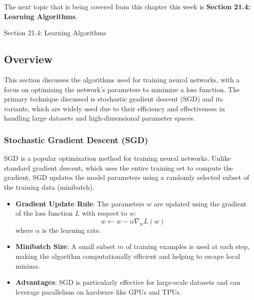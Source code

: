 The next topic that is being covered from this chapter this week is \textbf{Section 21.4: Learning Algorithms}.

\begin{notes}{Section 21.4: Learning Algorithms}
    \subsection*{Overview}

    This section discusses the algorithms used for training neural networks, with a focus on optimizing the network's parameters to minimize a loss function. The primary technique discussed is stochastic 
    gradient descent (SGD) and its variants, which are widely used due to their efficiency and effectiveness in handling large datasets and high-dimensional parameter spaces.
    
    \subsubsection*{Stochastic Gradient Descent (SGD)}
    
    SGD is a popular optimization method for training neural networks. Unlike standard gradient descent, which uses the entire training set to compute the gradient, SGD updates the model parameters using 
    a randomly selected subset of the training data (minibatch).
    
    \begin{highlight}
    
        \begin{itemize}
            \item \textbf{Gradient Update Rule}: The parameters $w$ are updated using the gradient of the loss function $L$ with respect to $w$:
            \[
            w \leftarrow w - \alpha \nabla_w L(w)
            \]
            where $\alpha$ is the learning rate.
            \item \textbf{Minibatch Size}: A small subset $m$ of training examples is used at each step, making the algorithm computationally efficient and helping to escape local minima.
            \item \textbf{Advantages}: SGD is particularly effective for large-scale datasets and can leverage parallelism on hardware like GPUs and TPUs.
        \end{itemize}
    
    \end{highlight}
    

\end{notes}
